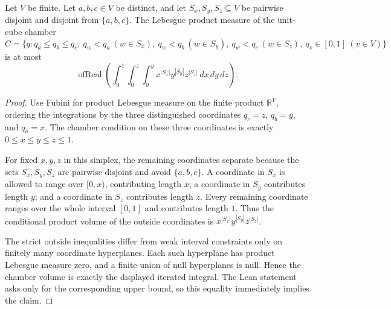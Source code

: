 \begin{helper}
Let \(V\) be finite.  Let \(a,b,c\in V\) be distinct, and let
\(S_x,S_y,S_z\subseteq V\) be pairwise disjoint and disjoint from
\(\{a,b,c\}\).  The Lebesgue product measure of the unit-cube chamber
\[
C=\{q:q_a\le q_b\le q_c,\ q_w<q_a\ (w\in S_x),\
q_w<q_b\ (w\in S_y),\ q_w<q_c\ (w\in S_z),\
q_v\in[0,1]\ (v\in V)\}
\]
is at most
\[
\operatorname{ofReal}\left(\int_0^1\int_0^z\int_0^y
x^{|S_x|}y^{|S_y|}z^{|S_z|}\,dx\,dy\,dz\right).
\]
\end{helper}
\begin{proof}
Use Fubini for product Lebesgue measure on the finite product
\(\mathbb R^V\), ordering the integrations by the three distinguished
coordinates \(q_c=z\), \(q_b=y\), and \(q_a=x\).  The chamber condition on
these three coordinates is exactly \(0\le x\le y\le z\le1\).

For fixed \(x,y,z\) in this simplex, the remaining coordinates separate
because the sets \(S_x,S_y,S_z\) are pairwise disjoint and avoid
\(\{a,b,c\}\).  A coordinate in \(S_x\) is allowed to range over \([0,x)\),
contributing length \(x\); a coordinate in \(S_y\) contributes length \(y\);
and a coordinate in \(S_z\) contributes length \(z\).  Every remaining
coordinate ranges over the whole interval \([0,1]\) and contributes length
\(1\).  Thus the conditional product volume of the outside coordinates is
\(x^{|S_x|}y^{|S_y|}z^{|S_z|}\).

The strict outside inequalities differ from weak interval constraints only on
finitely many coordinate hyperplanes.  Each such hyperplane has product
Lebesgue measure zero, and a finite union of null hyperplanes is null.  Hence
the chamber volume is exactly the displayed iterated integral.  The Lean
statement asks only for the corresponding upper bound, so this equality
immediately implies the claim.
\end{proof}
